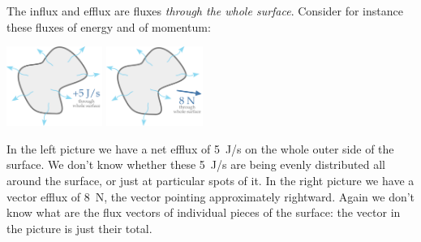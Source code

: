 \documentclass[a4paper,12pt,%
onecolumn,oneside,%
british%
]{memoir}
\renewcommand*{\|}[1][]{\nonscript\:#1\vert\nonscript\:\mathopen{}}
\begin{document}
The influx and efflux are fluxes \emph{through the whole surface}. Consider for instance these fluxes of energy and of momentum:
\begin{center}
  \hspace*{\fill}
  \includegraphics[align=c,height=7em]{images/efflux_J.pdf}
  \hfill
  \includegraphics[align=c,height=7em]{images/efflux_N.pdf}
  \hspace*{\fill}
\end{center}
In the left picture we have a net efflux of \qty{+5}{J/s} on the whole outer side of the surface. We don't know whether these \qty{5}{J/s} are being evenly distributed all around the surface, or just at particular spots of it. In the right picture we have a vector efflux of \qty{8}{N}, the vector pointing approximately rightward. Again we don't know what are the flux vectors of individual pieces of the surface: the vector in the picture is just their total.
\end{document}
